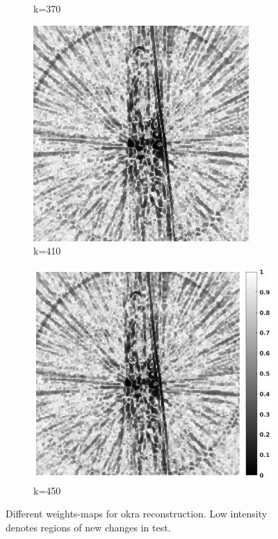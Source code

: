 \documentclass[journal]{IEEEtran}
\begin{document}
\begin{figure}[h]
\begin{subfigure}[b]{0.24\linewidth}
        \caption{k=370}
     \end{subfigure}
   \begin{subfigure}[b]{0.24\linewidth}
        \includegraphics[width=\textwidth]{../images/okra/2D_okra/weightsIm_410normalized.png}
        \caption{k=410}
     \end{subfigure}
   \begin{subfigure}[b]{0.24\linewidth}
        \includegraphics[width=1.15\textwidth]{../images/okra/2D_okra/weightsIm_450normalized_colorbar.png}
        \caption{k=450}
     \end{subfigure}
    \caption{Different weights-maps for okra reconstruction. Low intensity denotes regions of new changes in test.}
\label{fig:few_view_okra_2D_weights}
\end{figure}
\end{document}
